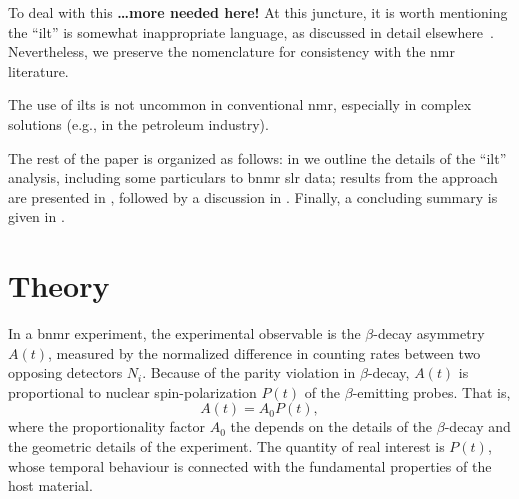 \documentclass[
  aps,
  prb,
  twocolumn,
  reprint,
  superscriptaddress,
  floatfix,
  citeautoscript,
  longbibliography,
]{revtex4-2}
\newcommand{\latin}[1]{#1}
\begin{document}
To deal with this \textbf{\dots more needed here!}
At this juncture, it is worth mentioning the ``\gls{ilt}'' is somewhat inappropriate language, as discussed in detail elsewhere~\cite{2017-Fordham-DF-29-2}.
Nevertheless, we preserve the nomenclature for consistency with the \gls{nmr} literature.



The use of \glspl{ilt} is not uncommon in conventional \gls{nmr}, especially in complex solutions (\latin{e.g.}, in the petroleum industry).




The rest of the paper is organized as follows:
in  we outline the details of the ``\gls{ilt}'' analysis, including some particulars to \gls{bnmr} \gls{slr} data;
results from the approach are presented in ,
followed by a discussion in .
Finally, a concluding summary is given in .


\section{Theory \label{sec:theory}}

In a \gls{bnmr} experiment, the experimental observable is the $\beta$-decay asymmetry $A(t)$, measured by the normalized difference in counting rates between two opposing detectors $N_{i}$.
Because of the parity violation in $\beta$-decay, $A(t)$ is proportional to nuclear spin-polarization $P(t)$ of the $\beta$-emitting probes.
That is,
\begin{equation}
   A(t) = A_{0} P(t),
\end{equation}
where the proportionality factor $A_{0}$ the depends on the details of the $\beta$-decay and the geometric details of the experiment.
The quantity of real interest is $P(t)$, whose temporal behaviour is connected with the fundamental properties of the host material.
\end{document}
